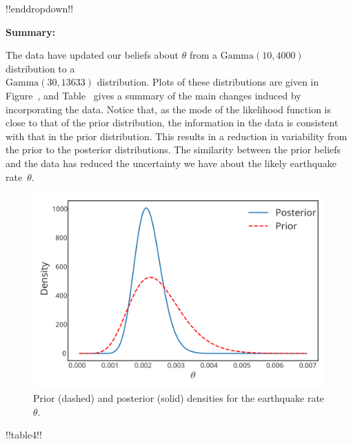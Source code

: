 {!!enddropdown!!


\textbf{Summary:}

The data have updated our beliefs about $\theta$ from a
$\mathrm{Gamma}(10,4000)$ distribution to a \\ $\mathrm{Gamma}(30,13633)$ distribution. Plots of
these distributions are given in Figure~, and Table~ gives a summary of the main changes induced by incorporating the data. Notice that, as the mode of the likelihood function is close to that of the prior distribution, the information in the data is consistent with that in the prior distribution. This results in a reduction in variability from the prior to the posterior distributions. The similarity between the prior beliefs and the data has reduced the uncertainty we have about the likely earthquake rate~$\theta$.

\begin{figure}[ht]

\includegraphics{images/priorposterior3.svg}
\caption{Prior (dashed) and posterior (solid) densities for the earthquake rate $\theta$.} 


\end{figure}



!!table4!!}



